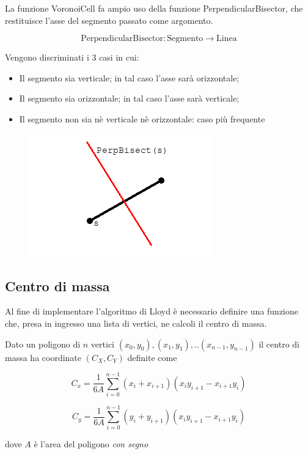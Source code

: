 \documentclass[10pt,a4paper]{article}
\newcommand{\modelicaclass}[1]{

}
\newcommand{\name}[1]{{\color{purple}#1}}
\begin{document}
La funzione \name{VoronoiCell} fa ampio uso della funzione \name{PerpendicularBisector}, che restituisce l'asse del segmento passato come argomento.

\[
\text{PerpendicularBisector} : \text{Segmento} \longrightarrow \text{Linea}
\]


Vengono discriminati i 3 casi in cui:

\begin{itemize}
	\item Il segmento sia verticale; in tal caso l'asse sarà orizzontale;
	\item Il segmento sia orizzontale; in tal caso l'asse sarà verticale;
	\item Il segmento non sia nè verticale nè orizzontale: caso più frequente
\end{itemize}

\begin{figure}[H]
\centering
\includegraphics[scale=0.7]{PerpendicularBisector.png}
\end{figure}

\modelicaclass{PerpendicularBisector.mo}

\subsection{Centro di massa}

Al fine di implementare l'algoritmo di Lloyd è necessario definire una funzione che, presa in ingresso una lista di vertici, ne calcoli il centro di massa.

Dato un poligono di $n$ vertici $(x_0, y_0), (x_1, y_1), ..(x_{n-1},y_{n-1})$ il centro di massa ha coordinate $(C_X, C_Y)$ definite come

\[
C_x = \frac{1}{6 A} \sum_{i=0}^{n-1} (x_i + x_{i+1}) (x_i y_{i+1} - x_{i+1} y_i)
\]

\[
C_y = \frac{1}{6 A} \sum_{i=0}^{n-1} (y_i + y_{i+1}) (x_i y_{i+1} - x_{i+1} y_i)
\]

dove $A$ è l'area del poligono \textit{con segno}
\end{document}
